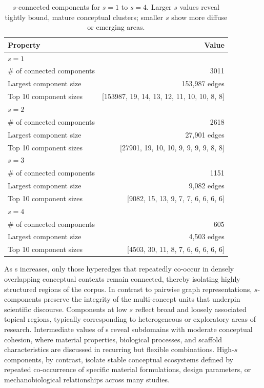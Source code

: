 \documentclass{article}
\begin{document}
\begin{table}[htbp]
\centering
\begin{tabular}{lr}
\toprule
\textbf{Property} & \textbf{Value} \\
\midrule
\multicolumn{2}{l}{$s=1$} \\
\quad \# of connected components & 3011 \\
\quad Largest component size & 153{,}987 edges \\
\quad Top 10 component sizes & [153987, 19, 14, 13, 12, 11, 10, 10, 8, 8] \\
\midrule
\multicolumn{2}{l}{$s=2$} \\
\quad \# of connected components & 2618 \\
\quad Largest component size & 27{,}901 edges \\
\quad Top 10 component sizes & [27901, 19, 10, 10, 9, 9, 9, 9, 8, 8] \\
\midrule
\multicolumn{2}{l}{$s=3$} \\
\quad \# of connected components & 1151 \\
\quad Largest component size & 9{,}082 edges \\
\quad Top 10 component sizes & [9082, 15, 13, 9, 7, 7, 6, 6, 6, 6] \\
\midrule
\multicolumn{2}{l}{$s=4$} \\
\quad \# of connected components & 605 \\
\quad Largest component size & 4{,}503 edges \\
\quad Top 10 component sizes & [4503, 30, 11, 8, 7, 6, 6, 6, 6, 6] \\
\bottomrule
\end{tabular}
\caption{$s$-connected components for $s=1$ to $s=4$. Larger $s$ values reveal tightly bound, mature conceptual clusters; smaller $s$ show more diffuse or emerging areas.}
\label{tab:s_components}
\end{table}


As s increases, only those hyperedges that repeatedly co-occur in densely overlapping conceptual contexts remain connected, thereby isolating highly structured regions of the corpus. In contrast to pairwise graph representations, $s$-components preserve the integrity of the multi-concept units that underpin scientific discourse. Components at low $s$ reflect broad and loosely associated topical regions, typically corresponding to heterogeneous or exploratory areas of research. Intermediate values of s reveal subdomains with moderate conceptual cohesion, where material properties, biological processes, and scaffold characteristics are discussed in recurring but flexible combinations. High-$s$ components, by contrast, isolate stable conceptual ecosystems defined by repeated co-occurrence of specific material formulations, design parameters, or mechanobiological relationships across many studies.
\end{document}
